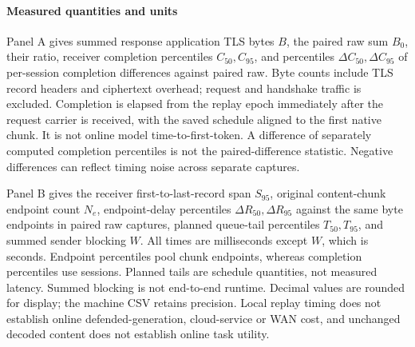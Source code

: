 \paragraph{Measured quantities and units}
Panel A gives summed response application TLS bytes $B$, the paired raw sum $B_0$, their ratio, receiver completion percentiles $C_{50},C_{95}$, and percentiles $\Delta C_{50},\Delta C_{95}$ of per-session completion differences against paired raw. Byte counts include TLS record headers and ciphertext overhead; request and handshake traffic is excluded. Completion is elapsed from the replay epoch immediately after the request carrier is received, with the saved schedule aligned to the first native chunk. It is not online model time-to-first-token. A difference of separately computed completion percentiles is not the paired-difference statistic. Negative differences can reflect timing noise across separate captures.

Panel B gives the receiver first-to-last-record span $S_{95}$, original content-chunk endpoint count $N_e$, endpoint-delay percentiles $\Delta R_{50},\Delta R_{95}$ against the same byte endpoints in paired raw captures, planned queue-tail percentiles $T_{50},T_{95}$, and summed sender blocking $W$. All times are milliseconds except $W$, which is seconds. Endpoint percentiles pool chunk endpoints, whereas completion percentiles use sessions. Planned tails are schedule quantities, not measured latency. Summed blocking is not end-to-end runtime. Decimal values are rounded for display; the machine CSV retains precision. Local replay timing does not establish online defended-generation, cloud-service or WAN cost, and unchanged decoded content does not establish online task utility.





